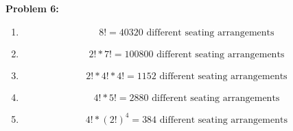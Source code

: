 \documentclass[12pt]{article}
\begin{document}
\noindent \textbf{Problem 6:}
\begin{enumerate}
    \item[(a)]
          \[
              8! = 40320 \text{ different seating arrangements}
          \]
    \item[(b)]
          \[
              2! * 7! =  100800 \text{ different seating arrangements}
          \]
    \item[(c)]
          \[
              2! * 4! * 4! =  1152 \text{ different seating arrangements}
          \]
    \item[(d)]
          \[
              4! * 5! = 2880 \text{ different seating arrangements}
          \]
    \item[(e)]
          \[
              4! * (2!)^4 =384 \text{ different seating arrangements}
          \]
\end{enumerate}
\end{document}
